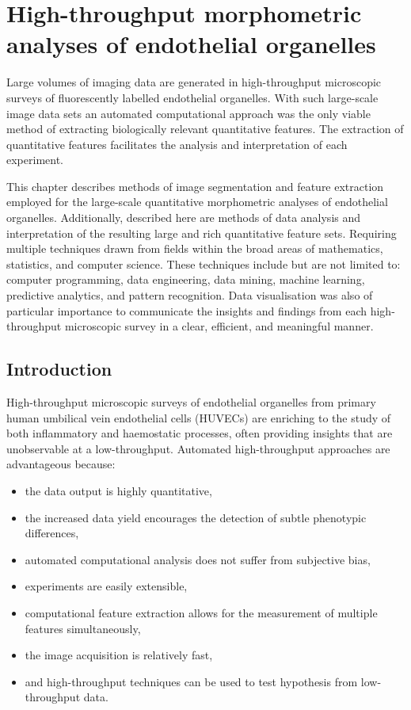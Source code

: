 \chapter{High-throughput morphometric analyses of endothelial organelles}
\label{endothelial_morphometry}
\ifpdf
	\graphicspath{{chapter_2/figs/}}
\fi


Large volumes of imaging data are generated in high-throughput microscopic surveys of fluorescently labelled endothelial organelles. With such large-scale image data sets an automated computational approach was the only viable method of extracting biologically relevant quantitative features. The extraction of quantitative features facilitates the analysis and interpretation of each experiment.

This chapter describes methods of image segmentation and feature extraction employed for the large-scale quantitative morphometric analyses of endothelial organelles. Additionally, described here are methods of data analysis and interpretation of the resulting large and rich quantitative feature sets. Requiring multiple techniques drawn from fields within the broad areas of mathematics, statistics, and computer science. These techniques include but are not limited to: computer programming, data engineering, data mining, machine learning, predictive analytics, and pattern recognition. Data visualisation was also of particular importance to communicate the insights and findings from each high-throughput microscopic survey in a clear, efficient, and meaningful manner.

\section{Introduction}
\label{endothelial_morphometry:introduction}
High-throughput microscopic surveys of endothelial organelles from primary human umbilical vein endothelial cells (HUVECs) are enriching to the study of both inflammatory and haemostatic processes, often providing insights that are unobservable at a low-throughput. Automated high-throughput approaches are advantageous because:
\begin{itemize}\setlength\itemsep{0pt}
	\item the data output is highly quantitative,
	\item the increased data yield encourages the detection of subtle phenotypic differences,
	\item automated computational analysis does not suffer from subjective bias,
	\item experiments are easily extensible,
	\item computational feature extraction allows for the measurement of multiple features simultaneously,
	\item the image acquisition is relatively fast,
	\item and high-throughput techniques can be used to test hypothesis from low-throughput data.
\end{itemize}

